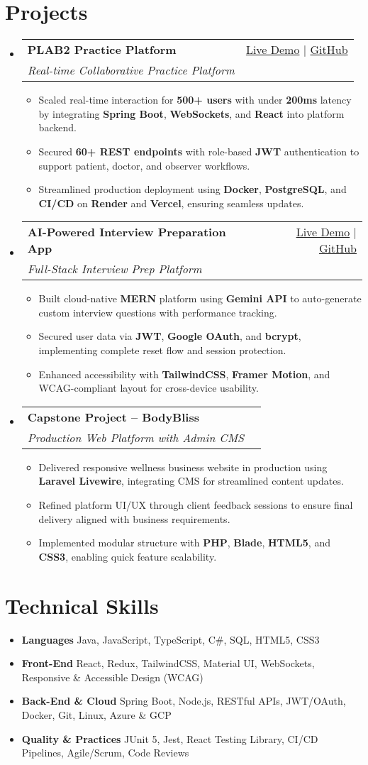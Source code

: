 \documentclass[letterpaper,11pt]{article}
\makeatletter
\newcommand{\resumeItem}[1]{\item\small{#1 \vspace{-2pt}}}
\newcommand{\resumeSubheading}[4]{
  \vspace{-1pt}\item
    \begin{tabular*}{0.97\textwidth}[t]{l@{\extracolsep{\fill}}r}
      \textbf{#1} & #2 \\
      \textit{\small#3} & \textit{\small #4} \\
    \end{tabular*}\vspace{-5pt}
}
\newcommand{\resumeSubHeadingListStart}{\begin{itemize}[leftmargin=*]}
\newcommand{\resumeSubHeadingListEnd}{\end{itemize}}
\newcommand{\resumeItemListStart}{\begin{itemize}}
\newcommand{\resumeItemListEnd}{\end{itemize}\vspace{-5pt}}
\makeatother
\begin{document}
\section{Projects}
  \resumeSubHeadingListStart
    \resumeSubheading
      {\textbf{PLAB2 Practice Platform}}{\href{https://plab2practice.com}{Live Demo} | \href{https://github.com/altansaid/plab2projectnew}{GitHub}}
      {Real-time Collaborative Practice Platform}{}
      \resumeItemListStart
        \resumeItem{Scaled real-time interaction for \textbf{500+ users} with under \textbf{200ms} latency by integrating \textbf{Spring Boot}, \textbf{WebSockets}, and \textbf{React} into platform backend.}
        \resumeItem{Secured \textbf{60+ REST endpoints} with role-based \textbf{JWT} authentication to support patient, doctor, and observer workflows.}
        \resumeItem{Streamlined production deployment using \textbf{Docker}, \textbf{PostgreSQL}, and \textbf{CI/CD} on \textbf{Render} and \textbf{Vercel}, ensuring seamless updates.}
      \resumeItemListEnd

    \resumeSubheading
      {\textbf{AI-Powered Interview Preparation App}}{\href{https://interviewcoach-ai.vercel.app}{Live Demo} | \href{https://github.com/altansaid/interviewcoach-ai}{GitHub}}
      {Full-Stack Interview Prep Platform}{}
      \resumeItemListStart
        \resumeItem{Built cloud-native \textbf{MERN} platform using \textbf{Gemini API} to auto-generate custom interview questions with performance tracking.}
        \resumeItem{Secured user data via \textbf{JWT}, \textbf{Google OAuth}, and \textbf{bcrypt}, implementing complete reset flow and session protection.}
        \resumeItem{Enhanced accessibility with \textbf{TailwindCSS}, \textbf{Framer Motion}, and WCAG-compliant layout for cross-device usability.}
      \resumeItemListEnd

    \resumeSubheading
      {\textbf{Capstone Project -- BodyBliss}}{}{Production Web Platform with Admin CMS}{}
      \resumeItemListStart
        \resumeItem{Delivered responsive wellness business website in production using \textbf{Laravel Livewire}, integrating CMS for streamlined content updates.}
        \resumeItem{Refined platform UI/UX through client feedback sessions to ensure final delivery aligned with business requirements.}
        \resumeItem{Implemented modular structure with \textbf{PHP}, \textbf{Blade}, \textbf{HTML5}, and \textbf{CSS3}, enabling quick feature scalability.}
      \resumeItemListEnd
  \resumeSubHeadingListEnd

\section{Technical Skills}
  \resumeItemListStart
    \resumeItem{\textbf{Languages}}{Java, JavaScript, TypeScript, C\#, SQL, HTML5, CSS3}
    \resumeItem{\textbf{Front-End}}{React, Redux, TailwindCSS, Material UI, WebSockets, Responsive \& Accessible Design (WCAG)}
    \resumeItem{\textbf{Back-End \& Cloud}}{Spring Boot, Node.js, RESTful APIs, JWT/OAuth, Docker, Git, Linux, Azure \& GCP}
    \resumeItem{\textbf{Quality \& Practices}}{JUnit 5, Jest, React Testing Library, CI/CD Pipelines, Agile/Scrum, Code Reviews}
  \resumeItemListEnd
\end{document}
